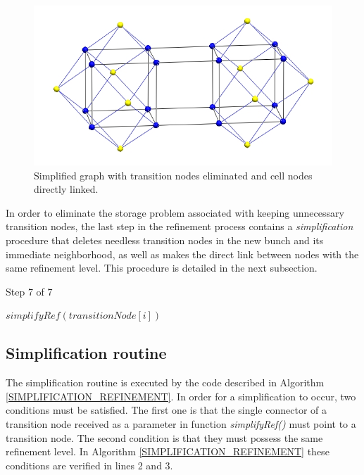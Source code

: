 \begin{figure}[!ht]
    \centering
    \includegraphics[scale=0.3,angle=0]{../img/graphSimplified.jpg}
    \caption{Simplified graph with transition nodes eliminated and cell nodes directly linked.}
    \label{FIG_AFTER_SIMPLIFY}
\end{figure}

In order to eliminate the storage problem associated with keeping
unnecessary transition nodes, the last step in the refinement
process contains a \textit{simplification} procedure that deletes
needless transition nodes in the new bunch and its immediate
neighborhood, as well as makes the direct link between nodes with
the same refinement level. This procedure is detailed in the next
subsection.

\begin{algorithm}[!ht]
    \caption{Step 7 of 7}
    \small{
    \begin{algorithmic}[1]
            \State $simplifyRef(transitionNode[i])$
        \EndFor
        \EndProcedure
    \end{algorithmic}
    }
    \label{STEP_7_REFINEMENT}
\end{algorithm}


\subsection{Simplification routine} \label{SUBSEC_SIMPLIFICATION_REF}

The simplification routine is executed by the code described in
Algorithm \ref{SIMPLIFICATION_REFINEMENT}. In order for a
simplification to occur, two conditions must be satisfied. The first
one is that the single connector of a transition node received as a
parameter in function \textit{simplifyRef()} must point to a
transition node. The second condition is that they must possess the
same refinement level. In Algorithm
\ref{SIMPLIFICATION_REFINEMENT} these conditions are verified
in lines 2 and 3.

